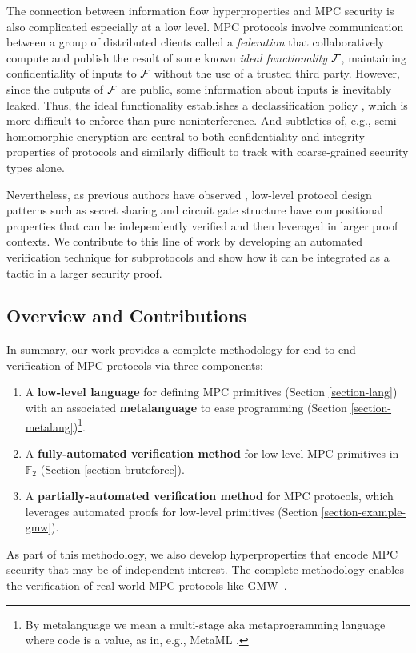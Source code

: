 The connection between information flow hyperproperties and MPC
security is also complicated especially at a low level.  MPC protocols
involve communication between a group of distributed clients called a
\emph{federation} that collaboratively compute and publish the result
of some known \emph{ideal functionality} $\mathcal{F}$, maintaining
confidentiality of inputs to $\mathcal{F}$ without the use of a trusted
third party. However, since the outputs of $\mathcal{F}$ are public, some
information about inputs is inevitably leaked. Thus, the ideal
functionality establishes a declassification policy
\cite{sabelfeld2009declassification}, which is more difficult to
enforce than pure noninterference.  And subtleties of, e.g.,
semi-homomorphic encryption are central to both confidentiality and
integrity properties of protocols and similarly difficult to track
with coarse-grained security types alone.

Nevertheless, as previous authors have observed
\cite{5a51987acaa84c43bb4bf5bcc7d01683}, low-level protocol design
patterns such as secret sharing and circuit gate structure have
compositional properties that can be independently verified and then
leveraged in larger proof contexts. We contribute to this line of work
by developing an automated verification technique for subprotocols and
show how it can be integrated as a tactic in a larger security proof.

\subsection{Overview and Contributions}

In summary, our work provides a complete methodology for end-to-end verification
of MPC protocols via three components:
%
\begin{enumerate}
\item A \textbf{low-level language} for defining MPC primitives
  (Section \ref{section-lang}) with an associated \textbf{metalanguage}
  to ease programming (Section \ref{section-metalang})\footnote{By metalanguage
  we mean a multi-stage aka metaprogramming language where code is a value, as
  in, e.g., MetaML \cite{TAHA2000211}.}. 
\item A \textbf{fully-automated verification method} for low-level MPC
  primitives in $\mathbb{F}_2$ (Section \ref{section-bruteforce}).
\item A \textbf{partially-automated verification method} for
  MPC protocols, which leverages automated proofs for
  low-level primitives (Section \ref{section-example-gmw}).
\end{enumerate}
%
As part of this methodology, we also develop hyperproperties that
encode MPC security that may be of independent interest. The complete
methodology enables the verification of real-world MPC protocols like
GMW~\cite{goldreich2019play}. 

